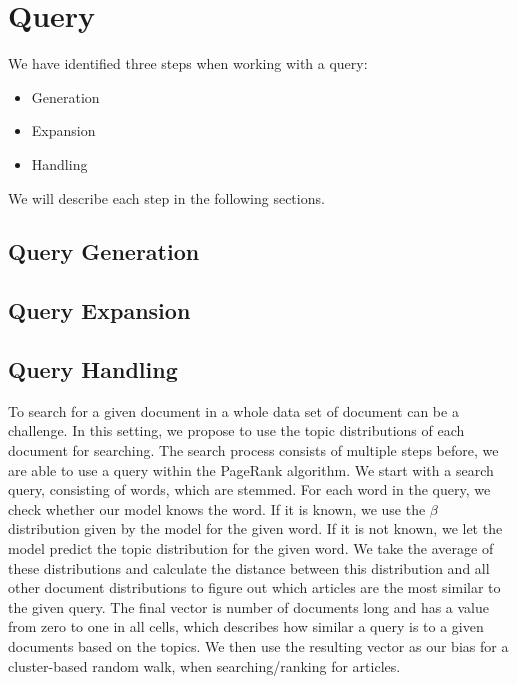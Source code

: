 \section{Query}
We have identified three steps when working with a query:
\begin{itemize}
	\item Generation
	\item Expansion
	\item Handling
\end{itemize}

We will describe each step in the following sections.


\subsection{Query Generation}


\subsection{Query Expansion}


\subsection{Query Handling}
To search for a given document in a whole data set of document can be a challenge. 
In this setting, we propose to use the topic distributions of each document for searching.
The search process consists of multiple steps before, we are able to use a query within the PageRank algorithm. 
We start with a search query, consisting of words, which are stemmed.
For each word in the query, we check whether our model knows the word.
If it is known, we use the $\beta$ distribution given by the model for the given word. 
If it is not known, we let the model predict the topic distribution for the given word.
We take the average of these distributions and calculate the distance between this distribution and all other document distributions to figure out which articles are the most similar to the given query.
The final vector is number of documents long and has a value from zero to one in all cells, which describes how similar a query is to a given documents based on the topics.
We then use the resulting vector as our bias for a cluster-based random walk, when searching/ranking for articles.
 